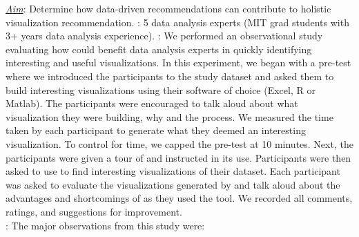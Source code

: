 {\it \underline{Aim}}: Determine how data-driven 
recommendations can contribute to holistic visualization recommendation.
: 5 data analysis experts (MIT grad students with 3+ years data analysis experience).
: We performed an observational study evaluating how \SeeDB could benefit data analysis experts in quickly identifying interesting and useful visualizations.
In this experiment, we began with a pre-test where we introduced the participants to the study dataset and asked them to build interesting visualizations using their software of choice (Excel, R or Matlab).
The participants were encouraged to talk aloud about what visualization they were building, why and the process.
We measured the time taken by each participant to generate what they deemed an interesting visualization.
To control for time, we capped the pre-test at 10 minutes.
Next, the participants were given a tour of \SeeDB and instructed in its use.
Participants were then asked to use \SeeDB to find interesting visualizations of their dataset.
Each participant was asked to evaluate the visualizations generated by \SeeDB and talk aloud about the advantages and shortcomings of \SeeDB as they used the tool.
We recorded all comments, ratings, and suggestions for improvement.\\
:
The major observations from this study were:
